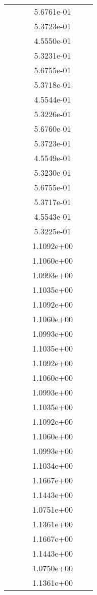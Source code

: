 \begin{xltabular}{\textwidth}{r|rS[table-format=1.3e+2]S[table-format=1.4e+2]S[table-format=1.4e+2]S[table-format=-1.5]}
&  &  & 5.6761e-01 & & \\
&  &  & 5.3723e-01 & & \\
&  &  & 4.5550e-01 & & \\
&  &  & 5.3231e-01 & & \\
&  &  & 5.6755e-01 & & \\
&  &  & 5.3718e-01 & & \\
&  &  & 4.5544e-01 & & \\
&  &  & 5.3226e-01 & & \\
&  &  & 5.6760e-01 & & \\
&  &  & 5.3723e-01 & & \\
&  &  & 4.5549e-01 & & \\
&  &  & 5.3230e-01 & & \\
&  &  & 5.6755e-01 & & \\
&  &  & 5.3717e-01 & & \\
&  &  & 4.5543e-01 & & \\
&  &  & 5.3225e-01 & & \\
&  &  & 1.1092e+00 & & \\
&  &  & 1.1060e+00 & & \\
&  &  & 1.0993e+00 & & \\
&  &  & 1.1035e+00 & & \\
&  &  & 1.1092e+00 & & \\
&  &  & 1.1060e+00 & & \\
&  &  & 1.0993e+00 & & \\
&  &  & 1.1035e+00 & & \\
&  &  & 1.1092e+00 & & \\
&  &  & 1.1060e+00 & & \\
&  &  & 1.0993e+00 & & \\
&  &  & 1.1035e+00 & & \\
&  &  & 1.1092e+00 & & \\
&  &  & 1.1060e+00 & & \\
&  &  & 1.0993e+00 & & \\
&  &  & 1.1034e+00 & & \\
&  &  & 1.1667e+00 & & \\
&  &  & 1.1443e+00 & & \\
&  &  & 1.0751e+00 & & \\
&  &  & 1.1361e+00 & & \\
&  &  & 1.1667e+00 & & \\
&  &  & 1.1443e+00 & & \\
&  &  & 1.0750e+00 & & \\
&  &  & 1.1361e+00 & & \\

\end{xltabular}
